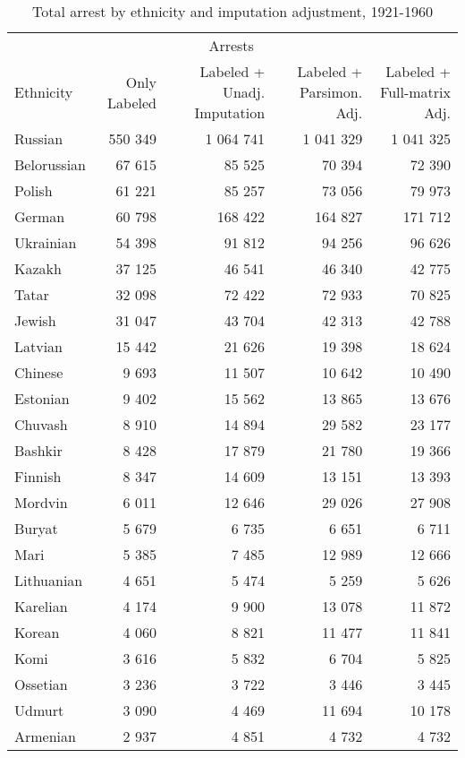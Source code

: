 \begin{table}[!h]

\caption{\label{tab:total_arrests_by_ethnicity}Total arrest by ethnicity and imputation adjustment, 1921-1960}
\centering
\fontsize{7}{9}\selectfont
\begin{tabular}{lrrrr}
\toprule
\multicolumn{1}{c}{ } & \multicolumn{3}{c}{Arrests} \\
\cmidrule(l{2pt}r{2pt}){2-4}
Ethnicity & Only Labeled & Labeled + Unadj. Imputation & Labeled + Parsimon. Adj. & Labeled + Full-matrix Adj.\\
\midrule
Russian & 550 349 & 1 064 741 & 1 041 329 & 1 041 325\\
Belorussian & 67 615 & 85 525 & 70 394 & 72 390\\
Polish & 61 221 & 85 257 & 73 056 & 79 973\\
German & 60 798 & 168 422 & 164 827 & 171 712\\
Ukrainian & 54 398 & 91 812 & 94 256 & 96 626\\
Kazakh & 37 125 & 46 541 & 46 340 & 42 775\\
Tatar & 32 098 & 72 422 & 72 933 & 70 825\\
Jewish & 31 047 & 43 704 & 42 313 & 42 788\\
Latvian & 15 442 & 21 626 & 19 398 & 18 624\\
Chinese & 9 693 & 11 507 & 10 642 & 10 490\\
Estonian & 9 402 & 15 562 & 13 865 & 13 676\\
Chuvash & 8 910 & 14 894 & 29 582 & 23 177\\
Bashkir & 8 428 & 17 879 & 21 780 & 19 366\\
Finnish & 8 347 & 14 609 & 13 151 & 13 393\\
Mordvin & 6 011 & 12 646 & 29 026 & 27 908\\
Buryat & 5 679 & 6 735 & 6 651 & 6 711\\
Mari & 5 385 & 7 485 & 12 989 & 12 666\\
Lithuanian & 4 651 & 5 474 & 5 259 & 5 626\\
Karelian & 4 174 & 9 900 & 13 078 & 11 872\\
Korean & 4 060 & 8 821 & 11 477 & 11 841\\
Komi & 3 616 & 5 832 & 6 704 & 5 825\\
Ossetian & 3 236 & 3 722 & 3 446 & 3 445\\
Udmurt & 3 090 & 4 469 & 11 694 & 10 178\\
Armenian & 2 937 & 4 851 & 4 732 & 4 732\\

\end{tabular}
\end{table}
